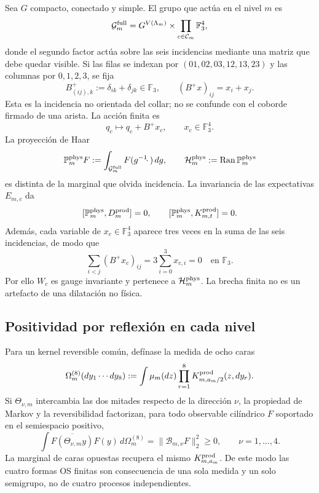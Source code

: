 Sea $G$ compacto, conectado y simple. El grupo que actúa en el nivel $m$ es
\[
 \mathcal G_m^{\rm full}
 =G^{V(\Lambda_m)}\times
  \prod_{c\in\mathcal C_m}\mathbb F_3^4,
\]
donde el segundo factor actúa sobre las seis incidencias mediante una matriz
que debe quedar visible. Si las filas se indexan por
$(01,02,03,12,13,23)$ y las columnas por $0,1,2,3$, se fija
\begin{equation}\label{eq:pdf2-ym-incidence-matrix}
 B^+_{(ij),k}:=\delta_{ik}+\delta_{jk}\in\mathbb F_3,
 \qquad
 (B^+x)_{ij}=x_i+x_j.
\end{equation}
Esta es la incidencia no orientada del collar; no se confunde con el
coborde firmado de una arista. La acción finita es
\begin{equation}\label{eq:pdf2-ym-incidence-action}
 q_c\longmapsto q_c+B^+x_c,
 \qquad x_c\in\mathbb F_3^4.
\end{equation}
La proyección de Haar
\begin{equation}\label{eq:pdf2-ym-proyeccion-fisica}
 \mathbb P_m^{\rm phys}F
 :=\int_{\mathcal G_m^{\rm full}}F(g^{-1}\!\cdot\,)\,dg,
 \qquad
 \mathcal H_m^{\rm phys}:=\operatorname{Ran}\mathbb P_m^{\rm phys}
\end{equation}
es distinta de la marginal que olvida incidencia. La invariancia de las
expectativas $E_{m,c}$ da
\begin{equation}\label{eq:pdf2-ym-reduccion}
 [\mathbb P_m^{\rm phys},D_m^{\rm prod}]=0,
 \qquad
 [\mathbb P_m^{\rm phys},K_{m,t}^{\rm prod}]=0.
\end{equation}
Además, cada variable de $x_c\in\mathbb F_3^4$ aparece tres veces en la suma de
las seis incidencias, de modo que
\begin{equation}\label{eq:pdf2-ym-incidence-conservation}
 \sum_{i<j}(B^+x_c)_{ij}
 =3\sum_{i=0}^3x_{c,i}=0
 \quad\text{en }\mathbb F_3.
\end{equation}
Por ello $W_c$ es gauge
invariante y pertenece a $\mathcal H_m^{\rm phys}$. La brecha finita no es un
artefacto de una dilatación no física.

\subsection{Positividad por reflexión en cada nivel}

Para un kernel reversible común, defínase la medida de ocho caras
\begin{equation}\label{eq:pdf2-ym-ocho-caras}
 \Omega_m^{(8)}(dy_1\cdots dy_8)
 :=\int\mu_m(dz)\prod_{r=1}^{8}K^{\rm prod}_{m,a_m/2}(z,dy_r).
\end{equation}
Si $\Theta_{\nu,m}$ intercambia las dos mitades respecto de la dirección
$\nu$, la propiedad de Markov y la reversibilidad factorizan, para todo observable
cilíndrico $F$ soportado en el semiespacio positivo,
\begin{equation}\label{eq:pdf2-ym-os-finita}
 \int\overline{F(\Theta_{\nu,m}y)}F(y)\,d\Omega_m^{(8)}
 =\|\mathcal B_{m,\nu}F\|_2^2\ge0,
 \qquad \nu=1,\ldots,4.
\end{equation}
La marginal de caras opuestas recupera el mismo
$K^{\rm prod}_{m,a_m}$. De este modo las cuatro formas OS finitas son
consecuencia de una sola medida y un solo semigrupo, no de cuatro procesos
independientes.

